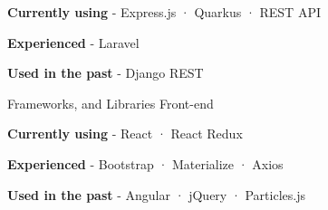 \begin{cventries}
{\begin{cvitems}
    \item {\textbf{Currently using} \hspace{0.03cm} - \hspace{0.03cm} Express.js \hspace{0.03cm} · \hspace{0.03cm} Quarkus \hspace{0.03cm} · \hspace{0.03cm} REST API} %
    \item {\textbf{Experienced} \hspace{0.03cm} - \hspace{0.03cm} Laravel} %
    \item {\textbf{Used in the past} \hspace{0.03cm} - \hspace{0.03cm} Django REST \\} %
  \end{cvitems}
}
  \cventry
    {Frameworks, and Libraries} %
    {Front-end} %
    {} %
    {} %
    {
      \begin{cvitems} %
        \item {\textbf{Currently using} \hspace{0.03cm} - \hspace{0.03cm} React \hspace{0.03cm} · \hspace{0.03cm} React Redux} %
        \item {\textbf{Experienced} \hspace{0.03cm} - \hspace{0.03cm} Bootstrap \hspace{0.03cm} · \hspace{0.03cm} Materialize \hspace{0.03cm} · \hspace{0.03cm} Axios} %
        \item {\textbf{Used in the past} \hspace{0.03cm} - \hspace{0.03cm} Angular \hspace{0.03cm} · \hspace{0.03cm} jQuery \hspace{0.03cm} · \hspace{0.03cm} Particles.js \\} %
      \end{cvitems}
}
\end{cventries}

